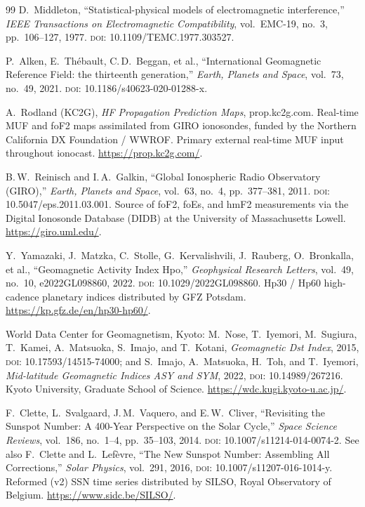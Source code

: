 \documentclass[11pt,a4paper]{article}
\begin{document}
\begin{thebibliography}{99}
  D.~Middleton,
  ``Statistical-physical models of electromagnetic interference,''
  \emph{IEEE Transactions on Electromagnetic Compatibility},
  vol.~EMC-19, no.~3, pp.~106--127, 1977.
  \textsc{doi}: 10.1109/TEMC.1977.303527.

  P.~Alken, E.~Th\'ebault, C.\,D.~Beggan, et al.,
  ``International Geomagnetic Reference Field: the thirteenth generation,''
  \emph{Earth, Planets and Space}, vol.~73, no.~49, 2021.
  \textsc{doi}: 10.1186/s40623-020-01288-x.

  A.~Rodland (KC2G),
  \emph{HF Propagation Prediction Maps},
  prop.kc2g.com.  Real-time MUF and foF2 maps assimilated from
  GIRO ionosondes, funded by the Northern California DX
  Foundation / WWROF.  Primary external real-time MUF input
  throughout ionocast.
  \url{https://prop.kc2g.com/}.

  B.\,W.~Reinisch and I.\,A.~Galkin,
  ``Global Ionospheric Radio Observatory (GIRO),''
  \emph{Earth, Planets and Space}, vol.~63, no.~4,
  pp.~377--381, 2011.
  \textsc{doi}: 10.5047/eps.2011.03.001.
  Source of foF2, foEs, and hmF2 measurements via the Digital
  Ionosonde Database (DIDB) at the University of Massachusetts
  Lowell.
  \url{https://giro.uml.edu/}.

  Y.~Yamazaki, J.~Matzka, C.~Stolle, G.~Kervalishvili,
  J.~Rauberg, O.~Bronkalla, et al.,
  ``Geomagnetic Activity Index Hpo,''
  \emph{Geophysical Research Letters}, vol.~49, no.~10,
  e2022GL098860, 2022.
  \textsc{doi}: 10.1029/2022GL098860.
  Hp30 / Hp60 high-cadence planetary indices distributed by GFZ
  Potsdam.
  \url{https://kp.gfz.de/en/hp30-hp60/}.

  World Data Center for Geomagnetism, Kyoto:
  M.~Nose, T.~Iyemori, M.~Sugiura, T.~Kamei, A.~Matsuoka,
  S.~Imajo, and T.~Kotani,
  \emph{Geomagnetic Dst Index}, 2015,
  \textsc{doi}: 10.17593/14515-74000;
  and S.~Imajo, A.~Matsuoka, H.~Toh, and T.~Iyemori,
  \emph{Mid-latitude Geomagnetic Indices ASY and SYM},
  2022, \textsc{doi}: 10.14989/267216.
  Kyoto University, Graduate School of Science.
  \url{https://wdc.kugi.kyoto-u.ac.jp/}.

  F.~Clette, L.~Svalgaard, J.\,M.~Vaquero, and E.\,W.~Cliver,
  ``Revisiting the Sunspot Number: A 400-Year Perspective on the
  Solar Cycle,''
  \emph{Space Science Reviews}, vol.~186, no.~1--4,
  pp.~35--103, 2014.
  \textsc{doi}: 10.1007/s11214-014-0074-2.
  See also F.~Clette and L.~Lef\`evre, ``The New Sunspot Number:
  Assembling All Corrections,'' \emph{Solar Physics}, vol.~291,
  2016, \textsc{doi}: 10.1007/s11207-016-1014-y.
  Reformed (v2) SSN time series distributed by SILSO, Royal
  Observatory of Belgium.
  \url{https://www.sidc.be/SILSO/}.


\end{thebibliography}
\end{document}
